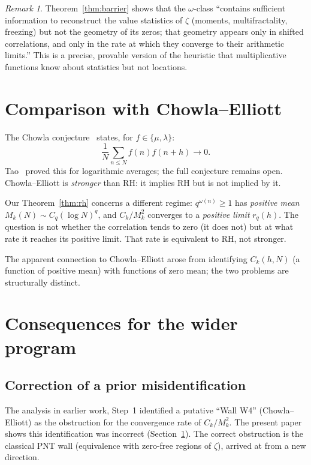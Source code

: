 \documentclass[11pt]{amsart}
\theoremstyle{definition}
\theoremstyle{remark}
\newtheorem{remark}[theorem]{Remark}
\newcommand{\om}{\omega}
\begin{document}
\begin{remark}
  Theorem~\ref{thm:barrier} shows that the $\om$-class
  ``contains sufficient information to reconstruct the value statistics of $\zeta$
  (moments, multifractality, freezing) but not the geometry of its zeros; that
  geometry appears only in shifted correlations, and only in the rate at which they
  converge to their arithmetic limits.''  This is a precise, provable version of
  the heuristic that multiplicative functions know about statistics but not locations.
\end{remark}

\section{Comparison with Chowla--Elliott}
\label{sec:chowla}

The Chowla conjecture~\cite{C65} states, for $f\in\{\mu,\lambda\}$:
\[
  \frac{1}{N}\sum_{n\le N} f(n)f(n+h) \to 0.
\]
Tao~\cite{T16} proved this for logarithmic averages; the full conjecture remains open.
Chowla--Elliott is \emph{stronger} than RH: it implies RH but is not implied by it.

Our Theorem~\ref{thm:rh} concerns a different regime: $q^{\om(n)}\ge 1$ has
\emph{positive mean} $M_k(N)\sim C_q(\log N)^q$, and $C_k/M_k^2$ converges to a
\emph{positive limit} $r_q(h)$.  The question is not whether the correlation tends to
zero (it does not) but at what rate it reaches its positive limit.  That rate is
equivalent to RH, not stronger.

The apparent connection to Chowla--Elliott arose from identifying
$C_k(h,N)$ (a function of positive mean) with functions of zero mean;
the two problems are structurally distinct.

\section{Consequences for the wider program}
\label{sec:consequences}

\subsection{Correction of a prior misidentification}

The analysis in earlier work, Step~1 identified a putative ``Wall W4''
(Chowla--Elliott) as the obstruction for the convergence rate of $C_k/M_k^2$.
The present paper shows this identification was incorrect (Section~\ref{sec:chowla}).
The correct obstruction is the classical PNT wall (equivalence with zero-free regions
of $\zeta$), arrived at from a new direction.
\end{document}
